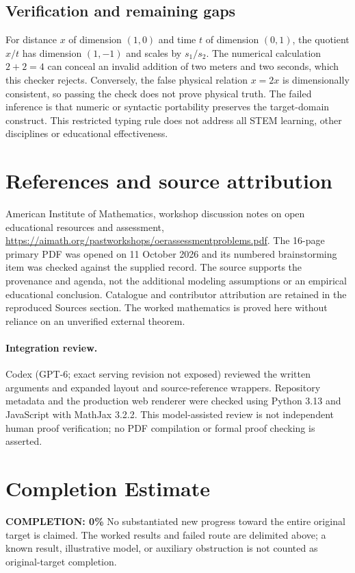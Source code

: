 \documentclass[11pt]{article}
\begin{document}
\subsection{Verification and remaining gaps}
For distance $x$ of dimension $(1,0)$ and time $t$ of dimension $(0,1)$, the quotient $x/t$ has dimension $(1,-1)$ and scales by $s_1/s_2$. The numerical calculation $2+2=4$ can conceal an invalid addition of two meters and two seconds, which this checker rejects. Conversely, the false physical relation $x=2x$ is dimensionally consistent, so passing the check does not prove physical truth. The failed inference is that numeric or syntactic portability preserves the target-domain construct. This restricted typing rule does not address all STEM learning, other disciplines or educational effectiveness.

\section{References and source attribution}
American Institute of Mathematics, workshop discussion notes on open educational resources and assessment, \url{https://aimath.org/pastworkshops/oerassessmentproblems.pdf}. The 16-page primary PDF was opened on 11 October 2026 and its numbered brainstorming item was checked against the supplied record. The source supports the provenance and agenda, not the additional modeling assumptions or an empirical educational conclusion. Catalogue and contributor attribution are retained in the reproduced Sources section. The worked mathematics is proved here without reliance on an unverified external theorem.


\paragraph{Integration review.} Codex (GPT-6; exact serving revision not exposed) reviewed the written arguments and expanded layout and source-reference wrappers. Repository metadata and the production web renderer were checked using Python 3.13 and JavaScript with MathJax 3.2.2. This model-assisted review is not independent human proof verification; no PDF compilation or formal proof checking is asserted.

\section{Completion Estimate}
\noindent\textbf{COMPLETION: 0\%}
No substantiated new progress toward the entire original target is claimed. The worked results and failed route are delimited above; a known result, illustrative model, or auxiliary obstruction is not counted as original-target completion.
\end{document}
